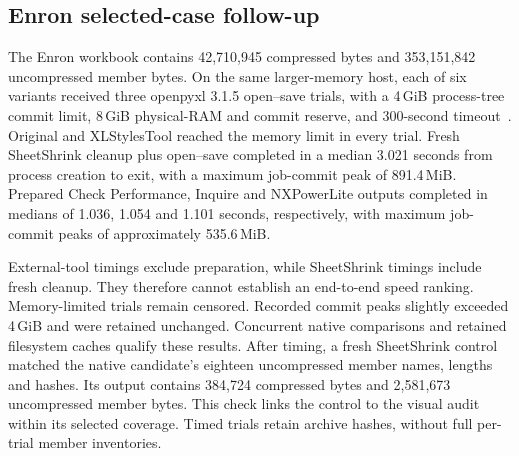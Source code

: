\subsection{Enron selected-case follow-up}
\label{sec:enron-open-save-followup}
The Enron workbook contains 42,710,945 compressed bytes and 353,151,842
uncompressed member bytes. On the same larger-memory host, each of six variants
received three openpyxl 3.1.5 open--save trials, with a 4\,GiB process-tree commit
limit, 8\,GiB physical-RAM and commit reserve, and 300-second
timeout~\cite{enronopenmemory}. Original and XLStylesTool reached the memory limit
in every trial. Fresh SheetShrink cleanup plus open--save completed in a median
3.021 seconds from process creation to exit, with a maximum job-commit peak of
891.4\,MiB. Prepared Check Performance, Inquire and NXPowerLite outputs completed
in medians of 1.036, 1.054 and 1.101 seconds, respectively, with maximum job-commit
peaks of approximately 535.6\,MiB.

External-tool timings exclude preparation, while SheetShrink timings include fresh
cleanup. They therefore cannot establish an end-to-end speed ranking.
Memory-limited trials remain censored. Recorded commit peaks slightly exceeded
4\,GiB and were retained unchanged. Concurrent native comparisons and retained
filesystem caches qualify these results. After timing, a fresh SheetShrink control
matched the native candidate's eighteen uncompressed member names, lengths and
hashes. Its output contains 384,724 compressed bytes and 2,581,673 uncompressed
member bytes. This check links the control to the visual audit within its selected
coverage. Timed trials retain archive hashes, without full per-trial member
inventories.
